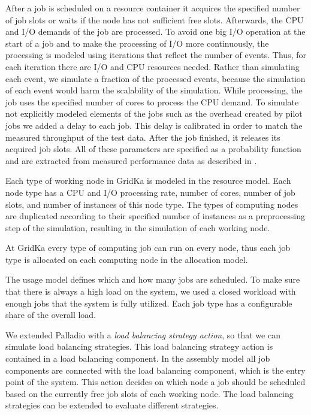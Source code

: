 \documentclass[a4paper]{jpconf}
\begin{document}
After a job is scheduled on a resource container it acquires the specified number of job slots or waits if the node has not sufficient free slots. Afterwards, the CPU and I/O demands of the job are processed. To avoid one big I/O operation at the start of a job and to make the processing of I/O more continuously, the processing is modeled using iterations that reflect the number of events. Thus, for each iteration there are I/O and CPU resources needed. Rather than simulating each event, we simulate a fraction of the processed events, because the simulation of each event would harm the scalability of the simulation. 
While processing, the job uses the specified number of cores to process the CPU demand. To simulate not explicitly modeled elements of the jobs such as the overhead created by pilot jobs we added a delay to each job. This delay is calibrated in order to match the measured throughput of the test data. After the job finished, it releases its acquired job slots. All of these parameters are specified as a probability function and are extracted from measured performance data as described in .

Each type of working node in GridKa is modeled in the resource model. Each node type has a CPU and I/O processing rate, number of cores, number of job slots, and number of instances of this node type. The types of computing nodes are duplicated according to their specified number of instances as a preprocessing step of the simulation, resulting in the simulation of each working node.

At GridKa every type of computing job can run on every node, thus each job type is allocated on each computing node in the allocation model.

The usage model defines which and how many jobs are scheduled. To make sure that there is always a high load on the system, we used a closed workload with enough jobs that the system is fully utilized. Each job type has a configurable share of the overall load.

We extended Palladio with a \textit{load balancing strategy action}, so that we can simulate load balancing strategies.
This load balancing strategy action is contained in a load balancing component.
In the assembly model all job components are connected with the load balancing component, which is the entry point of the system.
This action decides on which node a job should be scheduled based on the currently free job slots of each working node. The load balancing strategies can be extended to evaluate different strategies.
\end{document}
